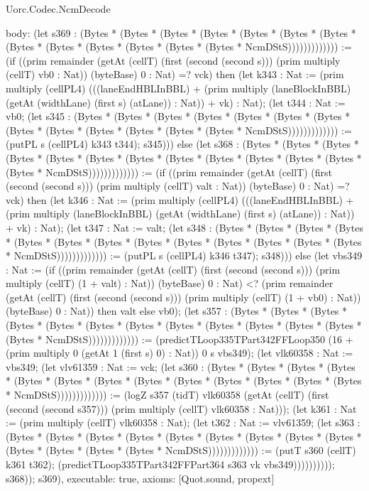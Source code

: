 \begin{lexlean}{Uorc.Codec.NcmDecode}
\begin{semanticmodule}
{  body: (let s369 : (Bytes * (Bytes * (Bytes * (Bytes * (Bytes * (Bytes * (Bytes * (Bytes * (Bytes * (Bytes * (Bytes * (Bytes * (Bytes * NcmDStS))))))))))))) := (if ((prim remainder (getAt (cellT) (first (second (second s))) (prim multiply (cellT) vb0 : Nat)) (byteBase) 0 : Nat) =? vck) then (let k343 : Nat := (prim multiply (cellPL4) (((laneEndHBLInBBL) + (prim multiply (laneBlockInBBL) (getAt (widthLane) (first s) (atLane)) : Nat)) + vk) : Nat); (let t344 : Nat := vb0; (let s345 : (Bytes * (Bytes * (Bytes * (Bytes * (Bytes * (Bytes * (Bytes * (Bytes * (Bytes * (Bytes * (Bytes * (Bytes * (Bytes * NcmDStS))))))))))))) := (putPL s (cellPL4) k343 t344); s345))) else (let s368 : (Bytes * (Bytes * (Bytes * (Bytes * (Bytes * (Bytes * (Bytes * (Bytes * (Bytes * (Bytes * (Bytes * (Bytes * (Bytes * NcmDStS))))))))))))) := (if ((prim remainder (getAt (cellT) (first (second (second s))) (prim multiply (cellT) valt : Nat)) (byteBase) 0 : Nat) =? vck) then (let k346 : Nat := (prim multiply (cellPL4) (((laneEndHBLInBBL) + (prim multiply (laneBlockInBBL) (getAt (widthLane) (first s) (atLane)) : Nat)) + vk) : Nat); (let t347 : Nat := valt; (let s348 : (Bytes * (Bytes * (Bytes * (Bytes * (Bytes * (Bytes * (Bytes * (Bytes * (Bytes * (Bytes * (Bytes * (Bytes * (Bytes * NcmDStS))))))))))))) := (putPL s (cellPL4) k346 t347); s348))) else (let vbs349 : Nat := (if ((prim remainder (getAt (cellT) (first (second (second s))) (prim multiply (cellT) (1 + valt) : Nat)) (byteBase) 0 : Nat) <? (prim remainder (getAt (cellT) (first (second (second s))) (prim multiply (cellT) (1 + vb0) : Nat)) (byteBase) 0 : Nat)) then valt else vb0); (let s357 : (Bytes * (Bytes * (Bytes * (Bytes * (Bytes * (Bytes * (Bytes * (Bytes * (Bytes * (Bytes * (Bytes * (Bytes * (Bytes * NcmDStS))))))))))))) := (predictTLoop335TPart342FFLoop350 (16 + (prim multiply 0 (getAt 1 (first s) 0) : Nat)) 0 s vbs349); (let vlk60358 : Nat := vbs349; (let vlv61359 : Nat := vck; (let s360 : (Bytes * (Bytes * (Bytes * (Bytes * (Bytes * (Bytes * (Bytes * (Bytes * (Bytes * (Bytes * (Bytes * (Bytes * (Bytes * NcmDStS))))))))))))) := (logZ s357 (tidT) vlk60358 (getAt (cellT) (first (second (second s357))) (prim multiply (cellT) vlk60358 : Nat))); (let k361 : Nat := (prim multiply (cellT) vlk60358 : Nat); (let t362 : Nat := vlv61359; (let s363 : (Bytes * (Bytes * (Bytes * (Bytes * (Bytes * (Bytes * (Bytes * (Bytes * (Bytes * (Bytes * (Bytes * (Bytes * (Bytes * NcmDStS))))))))))))) := (putT s360 (cellT) k361 t362); (predictTLoop335TPart342FFPart364 s363 vk vbs349)))))))))); s368)); s369),
  executable: true,
  axioms: [Quot.sound, propext]
}


\end{semanticmodule}
\end{lexlean}
